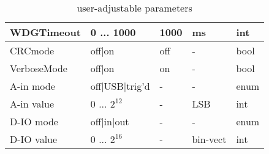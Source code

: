 \begin{table}[H]
\begin{tabular}{l|p{65mm}|l|l|l}
			WDGTimeout			& 0 ... 1000					& 1000			& ms		& int	\\ \hline
			CRCmode				& off|on						& off			& -			& bool	\\ \hline
			VerboseMode			& off|on						& on			& -			& bool	\\ \hline
			A-in mode			& off|USB|trig'd 				& -				& -			& enum	\\ \hline
			A-in value			& 0 ... $2^{12}$				& -				& LSB		& int	\\ \hline
			D-IO mode			& off|in|out 					& -				& -			& enum	\\ \hline
			D-IO value			& 0 ... $2^{16}$				& -				& bin-vect	& int	\\ \hline
					\end{tabular}
				\caption{user-adjustable parameters}
			\label{tab:params}
		\end{table}


